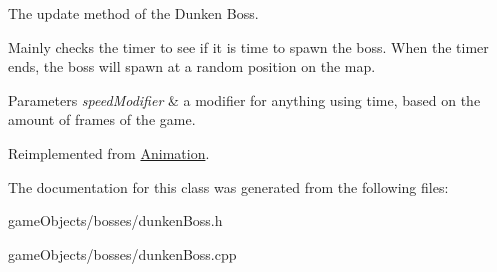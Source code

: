 The update method of the Dunken Boss. 

Mainly checks the timer to see if it is time to spawn the boss. When the timer ends, the boss will spawn at a random position on the map. 
\begin{DoxyParams}{Parameters}
{\em speed\+Modifier} & a modifier for anything using time, based on the amount of frames of the game. \\
\hline
\end{DoxyParams}


Reimplemented from \hyperlink{class_animation_ae17ebf5f4b47801e460eb63342d858e8}{Animation}.



The documentation for this class was generated from the following files\+:\begin{DoxyCompactItemize}
\item 
game\+Objects/bosses/dunken\+Boss.\+h\item 
game\+Objects/bosses/dunken\+Boss.\+cpp\end{DoxyCompactItemize}

